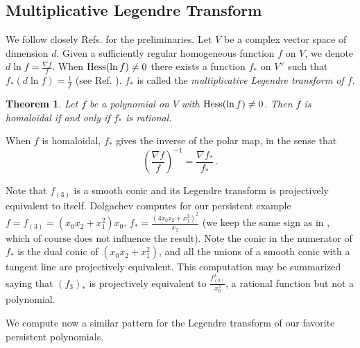 \documentclass[aps,floatfix,groupedaddress,superscriptaddress,longbibliography,footinbib,notitlepage,showpacs]{revtex4-1}
\def\Hess{{\rm Hess}}
\newtheorem{theorem}{Theorem}
\begin{document}
\subsection{Multiplicative Legendre Transform }

We follow closely Refs. \cite{Dol, EKP} for the preliminaries. Let $V$ be a complex vector space of dimension $d$.
Given a sufficiently regular homogeneous function $f$ on $V$,
we denote $d \ln f=\frac{\nabla f}{f}$. When $\Hess(\ln f)\neq 0$ there exists  a function $f_*$ on $V^\vee$ such that $f_*(d\ln f)=\frac{1}{f}$ (see Ref. \cite[Lemma 1]{Dol}).
$f_*$ is called the {\it multiplicative Legendre transform of $f$}.
\begin{theorem} \cite{Dol, EKP}
Let $f$ be a polynomial on $V$ with $\Hess(\ln f)\neq 0$. Then $f$ is homaloidal if and only if $f_*$ is rational.
\end{theorem}

When $f$ is homaloidal, $f_*$ gives the inverse of the polar map, in the sense that
\begin{equation}
\left(\frac{\nabla f}{f}\right)^{-1} = \frac{\nabla f_*}{f_*}\,.
\end{equation}

Note that $f_{(3)}$ is a smooth conic and its Legendre transform is projectively equivalent to itself.
Dolgachev computes for our persistent example $f=f_{(3)}=(x_0x_2+x_1^2)x_0$, 
$f_*=\frac{(4x_0x_2+x_1^2)^2}{x_2}$ (we keep the same sign as in \cite{Dol}, which of course does not influence the result).
Note the conic in the numerator of $f_*$ is the dual conic of $(x_0x_2+x_1^2)$, and all the unions of a smooth conic with a tangent line are projectively equivalent. This computation may be summarized saying that $\left(f_{3}\right)_*$
is projectively equivalent to $\frac{f_{(3)}^2}{x_0^3}$, a rational function but not a polynomial.

We compute now a similar pattern for the Legendre transform of our favorite persistent polynomials.
\end{document}

